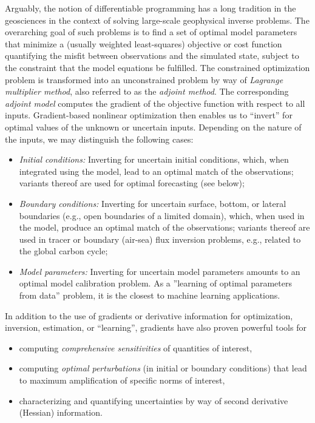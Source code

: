 Arguably, the notion of differentiable programming has a long tradition in the geosciences in the context of solving large-scale geophysical inverse problems.
The overarching goal of such problems is to find a set of optimal model parameters that minimize a (usually weighted least-squares) objective or cost function quantifying the misfit between observations and the simulated state, subject to the constraint that the model equations be fulfilled. 
The constrained optimization problem is transformed into an unconstrained problem by way of \emph{Lagrange multiplier method}, also referred to as the \emph{adjoint method}. 
The corresponding \textit{adjoint model} computes the gradient of the objective function with respect to all inputs. 
Gradient-based nonlinear optimization then enables us to
``invert'' for optimal values of the unknown or uncertain inputs.
Depending on the nature of the inputs, we may distinguish the following cases:
%
\begin{itemize}
\item \emph{Initial conditions:} Inverting for uncertain initial conditions, which, when integrated using the model, lead to an optimal match of the observations; variants thereof are used for optimal forecasting (see below);
\item \emph{Boundary conditions:} Inverting for uncertain surface, bottom, or lateral boundaries (e.g., open boundaries of a limited domain), which, when used in the model, produce an optimal match of the observations; variants thereof are used in tracer or boundary (air-sea) flux inversion problems, e.g., related to the global carbon cycle;
\item \emph{Model parameters:} Inverting for uncertain model parameters amounts to an optimal model calibration problem. As a ''learning of optimal parameters from data'' problem, it is the closest to machine learning applications.
\end{itemize}
%
In addition to the use of gradients or derivative information for optimization, inversion, estimation, or ``learning'', gradients have also proven powerful tools for 
\begin{itemize}
\item
computing \emph{comprehensive sensitivities} of quantities of interest,
\item 
computing \emph{optimal perturbations} (in initial or boundary conditions) that lead to maximum amplification of specific norms of interest,
\item
characterizing and quantifying uncertainties by way of second derivative (Hessian) information.
\end{itemize}
